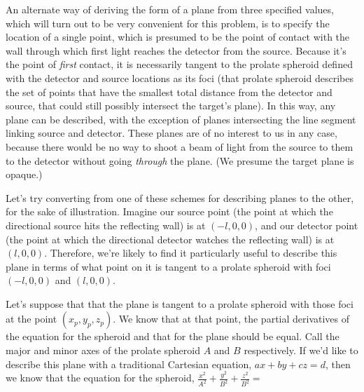 \documentclass[11pt]{article}
\begin{document}
An alternate way of deriving the form of a plane from three specified values, which will turn out to be very convenient for this problem, is to specify the location of a single point, which is presumed to be the point of contact with the wall through which first light reaches the detector from the source. Because it's the point of \emph{first} contact, it is necessarily tangent to the prolate spheroid defined with the detector and source locations as its foci (that prolate spheroid describes the set of points that have the smallest total distance from the detector and source, that could still possibly intersect the target's plane). In this way, any plane can be described, with the exception of planes intersecting the line segment linking source and detector. These planes are of no interest to us in any case, because there would be no way to shoot a beam of light from the source to them to the detector without going \emph{through} the plane. (We presume the target plane is opaque.)

Let's try converting from one of these schemes for describing planes to the other, for the sake of illustration. Imagine our source point (the point at which the directional source hits the reflecting wall) is at $(-l,0,0)$, and our detector point (the point at which the directional detector watches the reflecting wall) is at $(l,0,0)$. Therefore, we're likely to find it particularly useful to describe this plane in terms of what point on it is tangent to a prolate spheroid with foci $(-l,0,0)$ and $(l,0,0)$. 

Let's suppose that that the plane is tangent to a prolate spheroid with those foci at the point $(x_p,y_p,z_p)$. We know that at that point, the partial derivatives of the equation for the spheroid and that for the plane should be equal. Call the major and minor axes of the prolate spheroid $A$ and $B$ respectively. If we'd like to describe this plane with a traditional Cartesian equation, $ax + by + cz = d$, then we know that the equation for the spheroid, $\frac{x^2}{A^2} + \frac{y^2}{B^2} + \frac{z^2}{B^2} = $
\end{document}
